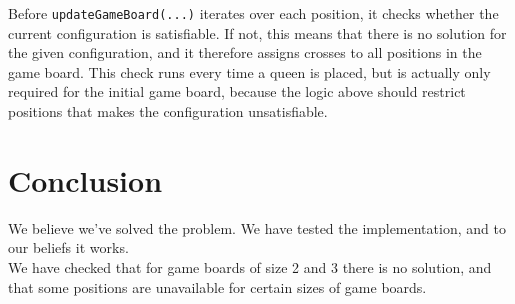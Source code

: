 Before \texttt{updateGameBoard(...)} iterates over each position, it checks whether the current configuration is satisfiable. If not, this means that there is no solution for the given configuration, and it therefore assigns crosses to all positions in the game board. This check runs every time a queen is placed, but is actually only required for the initial game board, because the logic above should restrict positions that makes the configuration unsatisfiable.

\section{Conclusion}
We believe we've solved the problem. We have tested the implementation, and to our beliefs it works. \\

We have checked that for game boards of size 2 and 3 there is no solution, and that some positions are unavailable for certain sizes of game boards.